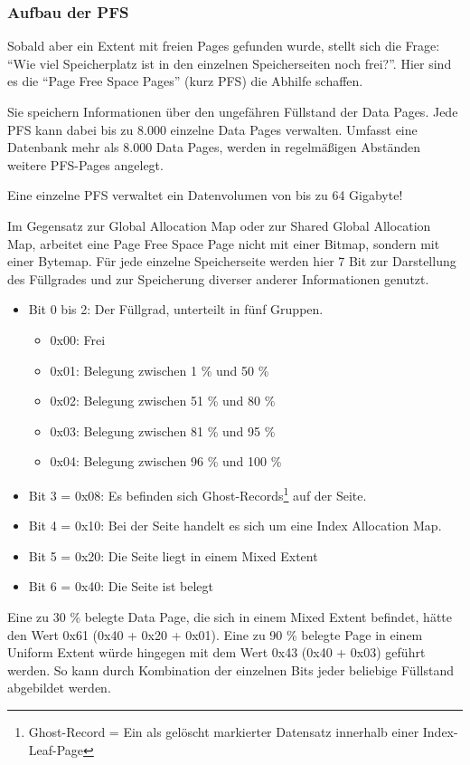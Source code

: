       \subsubsection{Aufbau der PFS}
        Sobald aber ein Extent mit freien Pages gefunden wurde, stellt sich die
        Frage: \enquote{Wie viel Speicherplatz ist in den einzelnen
        Speicherseiten noch frei?}.
        Hier sind es die \enquote{Page Free Space Pages} (kurz PFS) die Abhilfe
        schaffen.
        
        Sie speichern Informationen über den ungefähren Füllstand der Data Pages.
        Jede PFS kann dabei bis zu 8.000 einzelne Data Pages verwalten. Umfasst
        eine Datenbank mehr als 8.000 Data Pages, werden in regelmäßigen Abständen
        weitere PFS-Pages angelegt.
        \begin{merke}
          Eine einzelne PFS verwaltet ein Datenvolumen von bis zu 64 Gigabyte!
        \end{merke}
        
        Im Gegensatz zur Global Allocation Map oder zur Shared Global
        Allocation Map, arbeitet eine Page Free Space Page nicht mit einer
        Bitmap, sondern mit einer Bytemap. Für jede einzelne Speicherseite
        werden hier 7 Bit zur Darstellung des Füllgrades und zur Speicherung
        diverser anderer Informationen genutzt.
        \begin{itemize}
          \item Bit 0 bis 2: Der Füllgrad, unterteilt in fünf Gruppen.
            \begin{itemize}
              \item 0x00: Frei
              \item 0x01: Belegung zwischen 1 \% und 50 \%
              \item 0x02: Belegung zwischen 51 \% und 80 \%
              \item 0x03: Belegung zwischen 81 \% und 95 \%
              \item 0x04: Belegung zwischen 96 \% und 100 \%
            \end{itemize}
          \item Bit 3 = 0x08: Es befinden sich
          Ghost-Records\footnote{Ghost-Record = Ein als gelöscht markierter
          Datensatz innerhalb einer Index-Leaf-Page} auf der Seite.
          \item Bit 4 = 0x10: Bei der Seite handelt es sich um eine Index
          Allocation Map.
          \item Bit 5 = 0x20: Die Seite liegt in einem Mixed Extent
          \item Bit 6 = 0x40: Die Seite ist belegt
        \end{itemize}
\clearpage
        Eine zu 30 \% belegte Data Page, die sich in einem Mixed Extent
        befindet, hätte den Wert 0x61 (0x40 + 0x20 + 0x01). Eine zu 90 \%
        belegte Page in einem Uniform Extent würde hingegen  mit dem Wert 0x43
        (0x40 + 0x03) geführt werden. So kann durch Kombination der einzelnen
        Bits jeder beliebige Füllstand abgebildet werden.


